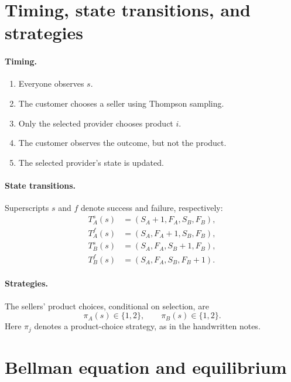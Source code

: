 \documentclass[11pt]{article}
\begin{document}
\section{Timing, state transitions, and strategies}

\paragraph{Timing.}
\begin{enumerate}
\item Everyone observes $s$.
\item The customer chooses a seller using Thompson sampling.
\item Only the selected provider chooses product $i$.
\item The customer observes the outcome, but not the product.
\item The selected provider's state is updated.
\end{enumerate}

\paragraph{State transitions.}
Superscripts $s$ and $f$ denote success and failure, respectively:
\begin{equation}
\begin{aligned}
T_A^s(s)&=(S_A+1,F_A,S_B,F_B),\\
T_A^f(s)&=(S_A,F_A+1,S_B,F_B),\\
T_B^s(s)&=(S_A,F_A,S_B+1,F_B),\\
T_B^f(s)&=(S_A,F_A,S_B,F_B+1).
\end{aligned}
\end{equation}

\paragraph{Strategies.}
The sellers' product choices, conditional on selection, are
\begin{equation}
\pi_A(s)\in\{1,2\},\qquad \pi_B(s)\in\{1,2\}.
\end{equation}
Here $\pi_j$ denotes a product-choice strategy, as in the handwritten notes.

\section{Bellman equation and equilibrium}
\end{document}

